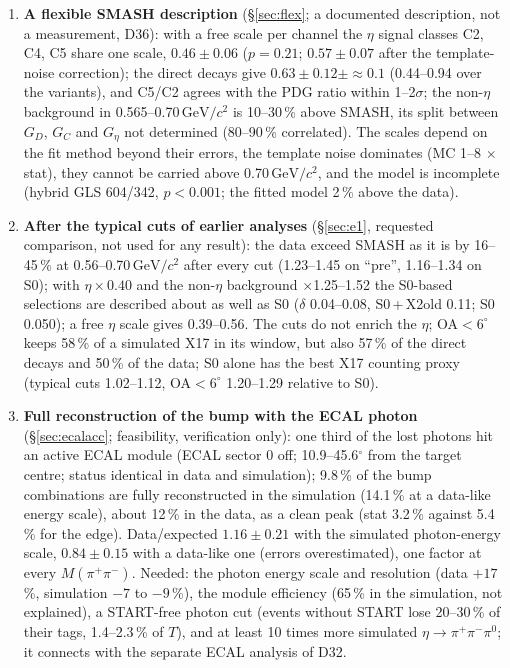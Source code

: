 \documentclass[11pt,a4paper]{article}
\newcommand{\piz}{\ensuremath{\pi^{0}}\xspace}
\newcommand{\pipi}{\ensuremath{\pi^{+}\pi^{-}}\xspace}
\newcommand{\Mpipi}{\ensuremath{M(\pi^{+}\pi^{-})}\xspace}
\newcommand{\GeVcc}{\ensuremath{\mathrm{GeV}/c^{2}}\xspace}
\newcommand{\sigeta}{\ensuremath{\sigma(pp\to\eta X)}\xspace}
\newcommand{\Geta}{\ensuremath{G_\eta}\xspace}
\newcommand{\cs}[1]{\textsf{#1}}%
\begin{document}
\begin{enumerate}
      (pp-elastic content 0.028 of the cell's, CB$/N$ 0.58) without $\eta$, probably from material in front of the cell (a hypothesis). $C_{\mathrm{vtx}}=1.006\pm0.021$ is not applied and is quoted as a one-sided $+2$\,\% ($+4$\,\% at
      95\,\% CL). The cut is validated, and it is not the cause of the low \sigeta (0.93\,mb would need 0.46).
\item \textbf{A flexible SMASH description} (\S\ref{sec:flex}; a documented description, not a measurement, D36): with a free scale per channel
      the $\eta$ signal classes C2, C4, C5 share one scale, $0.46\pm0.06$ ($p=0.21$; $0.57\pm0.07$ after the template-noise correction); the direct
      decays give $0.63\pm0.12\pm{\approx}0.1$ (0.44--0.94 over the variants), and C5/C2 agrees with the PDG ratio within 1--2$\sigma$; the
      non-$\eta$ background in 0.565--0.70\,\GeVcc is 10--30\,\% above SMASH, its split between $G_D$, $G_C$ and \Geta not determined (80--90\,\%
      correlated). The scales depend on the fit method beyond their errors, the template noise dominates (MC 1--8 $\times$ stat), they cannot be
      carried above 0.70\,\GeVcc, and the model is incomplete (hybrid GLS 604/342, $p<0.001$; the fitted model 2\,\% above the data).
\item \textbf{After the typical cuts of earlier analyses} (\S\ref{sec:e1}, requested comparison, not used for any result): the data exceed SMASH
      as it is by 16--45\,\% at 0.56--0.70\,\GeVcc after every cut (1.23--1.45 on ``pre'', 1.16--1.34 on S0); with $\eta\times0.40$ and the non-$\eta$
      background $\times$1.25--1.52 the S0-based selections are described about as well as S0 ($\delta$ 0.04--0.08, S0\,+\,\cs{X2old} 0.11; S0 0.050); a free $\eta$ scale gives 0.39--0.56.
      The cuts do not enrich the $\eta$; OA$<6^\circ$ keeps 58\,\% of a simulated X17 in its window, but also 57\,\% of the direct decays and 50\,\% of
      the data; S0 alone has the best X17 counting proxy (typical cuts 1.02--1.12, OA$<6^\circ$ 1.20--1.29 relative to S0).
\item \textbf{Full reconstruction of the bump with the ECAL photon} (\S\ref{sec:ecalacc}; feasibility, verification only): one third of the lost
      photons hit an active ECAL module (ECAL sector 0 off; 10.9--45.6$^\circ$ from the target centre; status identical in data and simulation);
      9.8\,\% of the bump combinations are fully reconstructed in the simulation (14.1\,\% at a data-like energy scale), about 12\,\% in the data, as a clean
      peak (stat 3.2\,\% against 5.4\,\% for the edge). Data/expected $1.16\pm0.21$ with the simulated photon-energy scale, $0.84\pm0.15$ with a
      data-like one (errors overestimated), one factor at every \Mpipi. Needed: the photon energy scale and resolution (data $+17$\,\%, simulation
      $-7$ to $-9$\,\%), the module efficiency (65\,\% in the simulation, not explained), a START-free photon cut (events without START lose 20--30\,\%
      of their tags, 1.4--2.3\,\% of $T$), and at least 10 times more simulated $\eta\to\pipi\piz$; it connects with the separate ECAL analysis of
      D32.
\end{enumerate}
\end{document}
